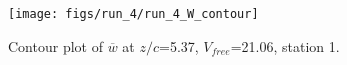 \begin{figure}[H]
\centering
\texttt{[image: figs/run\_4/run\_4\_W\_contour]}
\caption{Contour plot of $\overline{w}$ at $z/c$=5.37, $V_{free}$=21.06, station 1.}
\label{fig:run_4_W_contour}
\end{figure}


